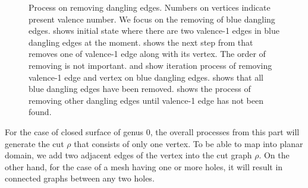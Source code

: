 \documentclass[a4paper,twoside]{article}
\begin{document}
\begin{figure}[bh!]
	\caption[]{Process on removing dangling edges. Numbers on vertices indicate present valence number. We focus on the removing of blue dangling edges.  shows initial state where there are two valence-1 edges in blue dangling edges at the moment.  shows the next step from  that removes one of valence-1 edge along with its vertex. The order of removing is not important.  and  show iteration process of removing valence-1 edge and vertex on blue dangling edges.  shows that all blue dangling edges have been removed.  shows the process of removing other dangling edges until valence-1 edge has not been found.}
	\label{fig:fig-original_remove_dangling_edges_step_by_step}
\end{figure}
For the case of closed surface of genus 0, the overall processes from this part will generate the cut $\rho$ that consists of only one vertex. To be able to map into planar domain, we add two adjacent edges of the vertex into the cut graph $\rho$. On the other hand, for the case of a mesh having one or more holes, it will result in connected graphs between any two holes.
\end{document}
